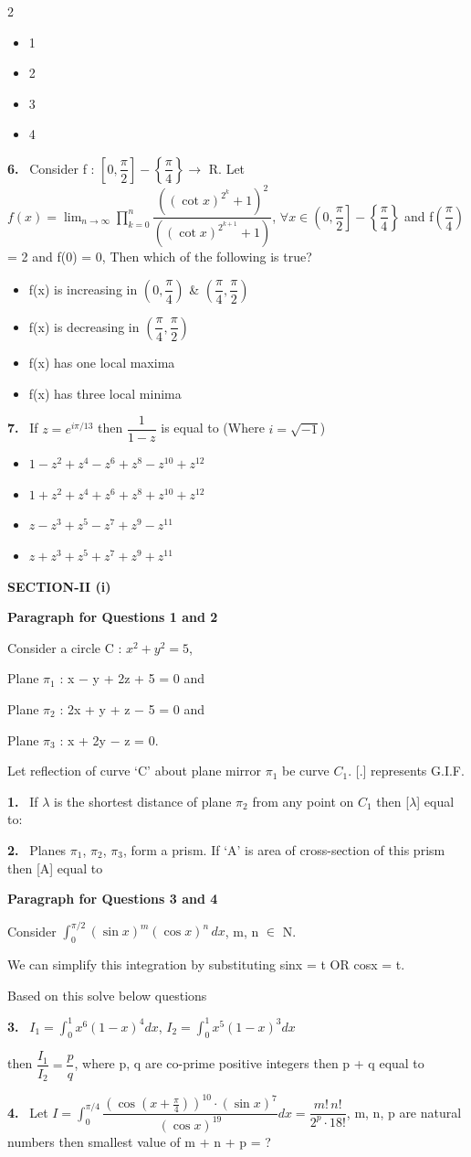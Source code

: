 \documentclass[10pt]{extarticle}
\newcommand{\sect}[1]{\par\smallskip\noindent\textbf{#1}\par}
\newcommand{\qn}[1]{\par\smallskip\noindent\textbf{#1.}~}
\newcommand{\paraq}[2]{\par\smallskip\noindent\textbf{Paragraph for Questions #1 and #2}\par}
\newenvironment{qoptions}{\begin{itemize}[leftmargin=1.8em,itemsep=1pt,topsep=2pt,label={}]}{\end{itemize}}
\newcommand{\opt}[2]{\item[(#1)] #2}
\begin{document}
\begin{multicols}{2}
\begin{qoptions}
\opt{A}{1}
\opt{B}{2}
\opt{C}{3}
\opt{D}{4}
\end{qoptions}
\qn{6} Consider f : $\left[0,\dfrac\pi2\right]-\left\{\dfrac\pi4\right\}\rightarrow$ R. Let $f(x)=\displaystyle\lim_{n\to\infty}\prod_{k=0}^n\dfrac{\left((\cot x)^{2^k}+1\right)^2}{\left((\cot x)^{2^{k+1}}+1\right)}$, $\forall x\in\left(0,\dfrac\pi2\right]-\left\{\dfrac\pi4\right\}$ and f$\left(\dfrac\pi4\right)$ = 2 and f(0) = 0, Then which of the following is true?
\begin{qoptions}
\opt{A}{f(x) is increasing in $\left(0,\dfrac\pi4\right)$ \& $\left(\dfrac\pi4,\dfrac\pi2\right)$}
\opt{B}{f(x) is decreasing in $\left(\dfrac\pi4,\dfrac\pi2\right)$}
\opt{C}{f(x) has one local maxima}
\opt{D}{f(x) has three local minima}
\end{qoptions}
\qn{7} If $z=e^{i\pi/13}$ then $\dfrac1{1-z}$ is equal to (Where $i=\sqrt{-1}$)
\begin{qoptions}
\opt{A}{$1-z^2+z^4-z^6+z^8-z^{10}+z^{12}$}
\opt{B}{$1+z^2+z^4+z^6+z^8+z^{10}+z^{12}$}
\opt{C}{$z-z^3+z^5-z^7+z^9-z^{11}$}
\opt{D}{$z+z^3+z^5+z^7+z^9+z^{11}$}
\end{qoptions}
\sect{SECTION-II (i)}
\paraq{1}{2}
Consider a circle C : $x^2+y^2=5$,\par
Plane $\pi_1$ : x $-$ y + 2z + 5 = 0 and\par
Plane $\pi_2$ : 2x + y + z $-$ 5 = 0 and\par
Plane $\pi_3$ : x + 2y $-$ z = 0.\par
Let reflection of curve `C' about plane mirror $\pi_1$ be curve $C_1$. [.] represents G.I.F.
\qn{1} If $\lambda$ is the shortest distance of plane $\pi_2$ from any point on $C_1$ then [$\lambda$] equal to:
\qn{2} Planes $\pi_1$, $\pi_2$, $\pi_3$, form a prism. If `A' is area of cross-section of this prism then [A] equal to
\paraq{3}{4}
Consider $\displaystyle\int_0^{\pi/2}(\sin x)^m(\cos x)^n\,dx$, m, n $\in$ N.\par
We can simplify this integration by substituting sinx = t OR cosx = t.\par
Based on this solve below questions
\qn{3} $I_1=\displaystyle\int_0^1x^6(1-x)^4dx$, $I_2=\displaystyle\int_0^1x^5(1-x)^3dx$\par
then $\dfrac{I_1}{I_2}=\dfrac pq$, where p, q are co-prime positive integers then p + q equal to
\qn{4} Let $I=\displaystyle\int_0^{\pi/4}\dfrac{\left(\cos\left(x+\frac\pi4\right)\right)^{10}\cdot(\sin x)^7}{(\cos x)^{19}}dx=\dfrac{m!\,n!}{2^p\cdot18!}$, m, n, p are natural numbers then smallest value of m + n + p = ?

\end{multicols}
\end{document}
